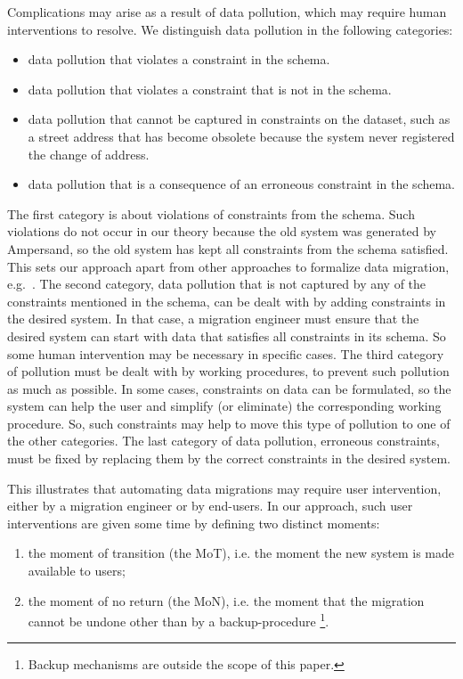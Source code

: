 \documentclass{elsarticle}
\begin{document}
   Complications may arise as a result of data pollution,
   which may require human interventions to resolve.
   We distinguish data pollution in the following categories:
\begin{itemize}
   \item data pollution that violates a constraint in the schema.
   \item data pollution that violates a constraint that is not in the schema.
   \item data pollution that cannot be captured in constraints on the dataset,
   such as a street address that has become obsolete because the system never registered the change of address.
   \item data pollution that is a consequence of an erroneous constraint in the schema.
\end{itemize}
   The first category is about violations of constraints from the schema.
   Such violations do not occur in our theory because the old system was generated by Ampersand,
   so the old system has kept all constraints from the schema satisfied.
   This sets our approach apart from other approaches to formalize data migration, e.g.~\cite{Thalheim2013}.
   The second category, data pollution that is not captured by any of the constraints mentioned in the schema,
   can be dealt with by adding constraints in the desired system.
   In that case, a migration engineer must ensure that the desired system can start with data that satisfies all constraints in its schema.
   So some human intervention may be necessary in specific cases.
   The third category of pollution must be dealt with by working procedures, to prevent such pollution as much as possible.
   In some cases, constraints on data can be formulated,
   so the system can help the user and simplify (or eliminate) the corresponding working procedure.
   So, such constraints may help to move this type of pollution to one of the other categories.
   The last category of data pollution, erroneous constraints, must be fixed by replacing them by the correct constraints in the desired system.

   This illustrates that automating data migrations may require user intervention,
   either by a migration engineer or by end-users.
   In our approach, such user interventions are given some time by
   defining two distinct moments:
\begin{enumerate}
   \item the moment of transition (the MoT), i.e. the moment the new system is made available to users;
   \item the moment of no return (the MoN), i.e. the moment that the migration cannot be undone other than by a backup-procedure%
\footnote{Backup mechanisms are outside the scope of this paper.}.
\end{enumerate}
\end{document}
